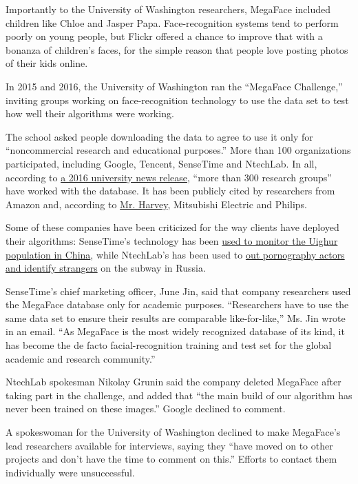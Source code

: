 Importantly to the University of Washington researchers, MegaFace
included children like Chloe and Jasper Papa. Face-recognition systems
tend to perform poorly on young people, but Flickr offered a chance to
improve that with a bonanza of children's faces, for the simple reason
that people love posting photos of their kids online.

In 2015 and 2016, the University of Washington ran the ``MegaFace
Challenge,'' inviting groups working on face-recognition technology to
use the data set to test how well their algorithms were working.

The school asked people downloading the data to agree to use it only for
``noncommercial research and educational purposes.'' More than 100
organizations participated, including Google, Tencent, SenseTime and
NtechLab. In all, according to
\href{https://www.washington.edu/news/2016/06/23/how-well-do-facial-recognition-algorithms-cope-with-a-million-strangers/}{a
2016 university news release}, ``more than 300 research groups'' have
worked with the database. It has been publicly cited by researchers from
Amazon and, according to
\href{https://megapixels.cc/datasets/megaface/}{Mr. Harvey}, Mitsubishi
Electric and Philips.

Some of these companies have been criticized for the way clients have
deployed their algorithms: SenseTime's technology has been
\href{https://www.nytimes3xbfgragh.onion/2019/04/14/technology/china-surveillance-artificial-intelligence-racial-profiling.html}{used
to monitor the Uighur population in China}, while NtechLab's has been
used to
\href{https://splinternews.com/this-face-recognition-company-is-causing-havoc-in-russi-1793856482}{out
pornography actors and identify strangers} on the subway in Russia.

SenseTime's chief marketing officer, June Jin, said that company
researchers used the MegaFace database only for academic purposes.
``Researchers have to use the same data set to ensure their results are
comparable like-for-like,'' Ms. Jin wrote in an email. ``As MegaFace is
the most widely recognized database of its kind, it has become the de
facto facial-recognition training and test set for the global academic
and research community.''

NtechLab spokesman Nikolay Grunin said the company deleted MegaFace
after taking part in the challenge, and added that ``the main build of
our algorithm has never been trained on these images.'' Google declined
to comment.

A spokeswoman for the University of Washington declined to make
MegaFace's lead researchers available for interviews, saying they ``have
moved on to other projects and don't have the time to comment on this.''
Efforts to contact them individually were unsuccessful.

